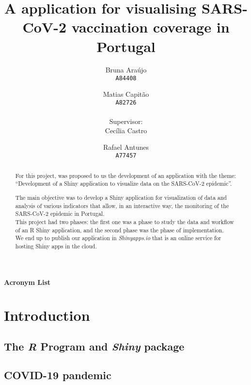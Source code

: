 \documentclass[11pt,a4paper]{report}
\title{A \Shiny application for visualising SARS-CoV-2 vaccination coverage in Portugal}
\author{
  Bruna Araújo\\
  \texttt{A84408}
  \and
  Matias Capitão\\
  \texttt{A82726} \\ 
  \\ Supervisor:\\
  Cecília Castro\\
  \and
  Rafael Antunes\\
  \texttt{A77457}
}
\date{}
\def\R{{\textsl{R }}}
\def\Shiny{\textsl{Shiny }}
\begin{document}
\maketitle

\begin{abstract}
    For this project, was proposed to us the development of an application with the theme: “Development of a Shiny application to visualize data on the SARS-CoV-2 epidemic”.
    
    
    The main objective was to develop a Shiny application for visualization
    of data and analysis of various indicators that allow, in an interactive way, the monitoring of the
    SARS-CoV-2 epidemic in Portugal. \\
    This project had two phases: the first one was a phase to study the data and workflow of an R Shiny application, and the second phase was the phase of implementation.\\
    We end up to publish our application in \textit{Shinyapps.io} that is an online service for hosting Shiny apps in the cloud.
    
    
     
    






    

    
    
    

\end{abstract}

\tableofcontents
\newpage

\listoffigures
\newpage

\newpage

{\huge\textbf{Acronym List}}\\



\chapter{Introduction}
\section{The \R Program and \Shiny package}




\section{COVID-19 pandemic}
\end{document}
